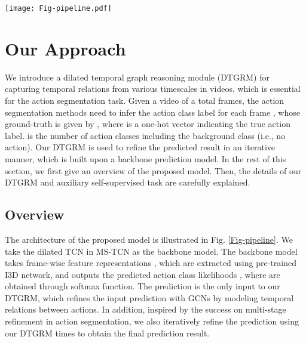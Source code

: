 \documentclass[letterpaper]{article} \usepackage{aaai21}  \usepackage{times}  \usepackage{helvet} \usepackage{courier}  \usepackage[hyphens]{url}  \usepackage{graphicx} \usepackage{mathtools}
\begin{document}
\begin{figure*}
	\begin{center}
		\texttt{[image: Fig-pipeline.pdf]}
	\end{center}
	\vspace{-0.2cm}
	\caption{The pipeline of the proposed DTGRM model. The frame-wise features are fed into the backbone model, and the action segmentation results are refined by our DTGRM model. Note that the dilated factor  is doubled at each level in DTGRM.  and  represent the action segmentation loss and auxiliary self-supervision loss respectively.}
	\label{Fig-pipeline}
\end{figure*}


\section{Our Approach}
We introduce a dilated temporal graph reasoning module (DTGRM) for capturing temporal relations from various timescales in videos, which is essential for the action segmentation task. Given a video of a total  frames, the action segmentation methods need to infer the action class label for each frame , whose ground-truth is given by , where  is a one-hot vector indicating the true action label.  is the number of action classes including the background class (i.e., no action). Our DTGRM is used to refine the predicted result in an iterative manner, which is built upon a backbone prediction model. In the rest of this section, we first give an overview of the proposed model. Then, the details of our DTGRM and auxiliary self-supervised task are carefully explained.

\subsection{Overview}
The architecture of the proposed model is illustrated in Fig. \ref{Fig-pipeline}. We take the dilated TCN in MS-TCN \cite{farha2019ms} as the backbone model. The backbone model takes frame-wise feature representations , which are extracted using pre-trained I3D network\cite{carreira2017quo}, and outputs the predicted action class likelihoods , where  are obtained through softmax function. The prediction  is the only input to our DTGRM, which refines the input prediction with GCNs by modeling temporal relations between actions. In addition, inspired by the success on multi-stage refinement \cite{farha2019ms} in action segmentation, we also iteratively refine the prediction using our DTGRM  times to obtain the final prediction result.
\end{document}
